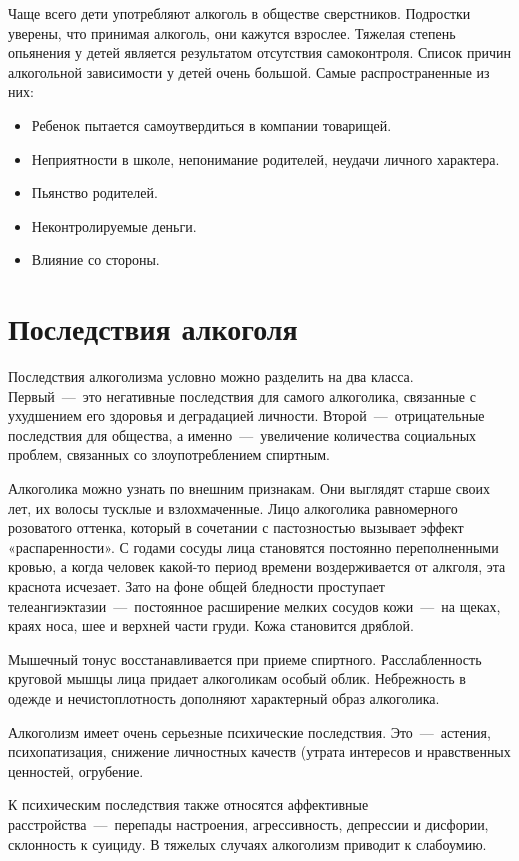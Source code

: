 \documentclass[14pt]{extarticle}
\begin{document}
Чаще всего дети употребляют алкоголь в обществе сверстников. Подростки уверены, что принимая алкоголь, они кажутся взрослее. Тяжелая степень опьянения у детей является результатом отсутствия самоконтроля. Список причин алкогольной зависимости у детей очень большой. Самые распространенные из них:

\begin{itemize}
	\item Ребенок пытается самоутвердиться в компании товарищей.
	\item Неприятности в школе, непонимание родителей, неудачи личного характера.
	\item Пьянство родителей.
	\item Неконтролируемые деньги.
	\item Влияние со стороны.
\end{itemize}	

\section{Последствия алкоголя}

Последствия алкоголизма условно можно разделить на два класса. Первый~---~это негативные последствия для самого алкоголика, связанные с ухудшением его здоровья и деградацией личности. Второй~---~отрицательные последствия для общества, а именно~---~увеличение количества социальных проблем, связанных со злоупотреблением спиртным.

Алкоголика можно узнать по внешним признакам. Они выглядят старше своих лет, их волосы тусклые и взлохмаченные. Лицо алкоголика равномерного розоватого оттенка, который в сочетании с пастозностью вызывает эффект «распаренности». С годами сосуды лица становятся постоянно переполненными кровью, а когда человек какой-то период времени воздерживается от алкголя, эта краснота исчезает. Зато на фоне общей бледности проступает телеангиэктазии~---~постоянное расширение мелких сосудов кожи~---~на щеках, краях носа, шее и верхней части груди. Кожа становится дряблой.

Мышечный тонус восстанавливается при приеме спиртного. Расслабленность круговой мышцы лица придает алкоголикам особый облик. Небрежность в одежде и нечистоплотность дополняют характерный образ алкоголика.

Алкоголизм имеет очень серьезные психические последствия. Это~---~астения, психопатизация, снижение личностных качеств (утрата интересов и нравственных ценностей, огрубение.

К психическим последствия также относятся аффективные расстройства~---~перепады настроения, агрессивность, депрессии и дисфории, склонность к суициду. В тяжелых случаях алкоголизм приводит к слабоумию.
\end{document}
